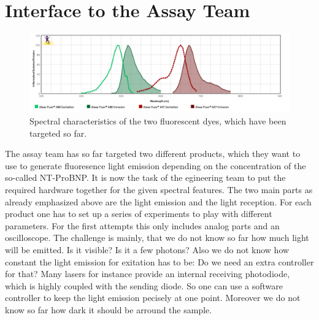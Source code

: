 \documentclass{report}
\begin{document}
\section{Interface to the Assay Team}
\begin{figure}[H]
	\includegraphics[width=\textwidth]{./fig/spectra.png}
	\caption{Spectral characteristics of the two fluorescent dyes, which have been targeted so far.}
	\label{fig:assays}
\end{figure}
The assay team has so far targeted two different products, which they want to use to generate fluoresence light emission depending on the concentration of the so-called NT-ProBNP. It is now the task of the egineering team to put the required hardware together for the given spectral features. The two main parts as already emphasized above are the light emission and the light reception. For each product one has to set up a series of experiments to play with different parameters. For the first attempts this only includes analog parts and an oscilloscope. The challenge is mainly, that we do not know so far    how much light will be emitted. Is it visible? Is it a few photons? Also we do not know how constant the light emission for exitation has to be: Do we need an extra controller for that? Many lasers for instance provide an internal receiving photodiode, which is highly coupled with the sending diode. So one can use a software controller to keep the light emission pecisely at one point. Moreover we do not know so far how dark it should be arround the sample. 
\end{document}
